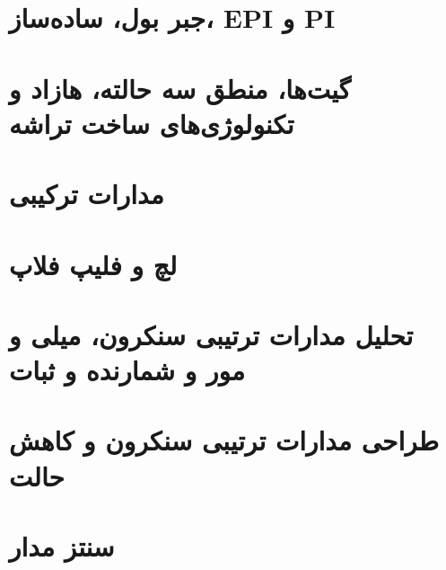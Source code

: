 \documentclass[a5paper]{article}
\begin{document}
\section{جبر بول، ساده‌ساز، EPI و PI}

\section{گیت‌ها، منطق سه حالته، هازاد و تکنولوژی‌های ساخت تراشه}

\section{مدارات ترکیبی}

\section{لچ و فلیپ فلاپ}

\section{تحلیل مدارات ترتیبی سنکرون، میلی و مور و شمارنده و ثبات}

\section{طراحی مدارات ترتیبی سنکرون و کاهش حالت}

\section{سنتز مدار}
\end{document}
